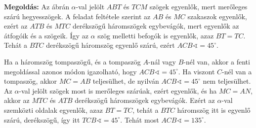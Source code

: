 \documentclass[a4paper,10pt]{article}
\begin{document}
{\bf Megoldás: } Az ábrán $\alpha$-val jelölt $ABT$ és $TCM$ szögek egyenlők, mert merőleges szárú hegyesszögek. A feladat feltétele szerint az $AB$ és $MC$ szakaszok egyenlők, ezért az $ATB$ és $MTC$  derékszögű háromszögek egybevágók, mert egyenlők az átfogóik és a szögeik. Így az $\alpha$ szög melletti befogók is egyenlők, azaz $BT=TC$. Tehát a $BTC$  derékszögű háromszög egyenlő szárú, ezért $ACB\sphericalangle=45^\circ$.
\begin{center}
\end{center}
Ha a háromszög tompaszögű, és a tompaszög $A$-nál vagy $B$-nél van, akkor a fenti megoldással azonos módon igazolható, hogy $ACB\sphericalangle=45^\circ$.
Ha viszont $C$-nél van a tompaszög, akkor $MC=AB$ teljesülhet, de nyilván $ACB\sphericalangle=45^\circ$ nem teljesülhet.
Az $\alpha$-val jelölt szögek most is merőleges szárúak, ezért egyenlők, és ha $MC=AN$, akkor az $MTC$ és $ATB$ derékszögű háromszögek egybevágók. Ezért az $\alpha$-val szemközti oldalak egyenlők, azaz $BT=TC$, tehát a $BTC$ háromszög itt is egyenlő szárú, derékszögű, így itt $TCB\sphericalangle=45^\circ$. Tehát most $ACB\sphericalangle=135^\circ$.
\end{document}
